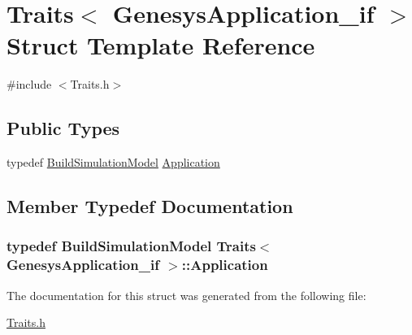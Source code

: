 \hypertarget{struct_traits_3_01_genesys_application__if_01_4}{}\section{Traits$<$ Genesys\+Application\+\_\+if $>$ Struct Template Reference}
\label{struct_traits_3_01_genesys_application__if_01_4}


{\ttfamily \#include $<$Traits.\+h$>$}

\subsection*{Public Types}
\begin{DoxyCompactItemize}
\item 
typedef \hyperlink{class_build_simulation_model}{Build\+Simulation\+Model} \hyperlink{struct_traits_3_01_genesys_application__if_01_4_af0589b9f1736bfc743309ed001e2b796}{Application}
\end{DoxyCompactItemize}


\subsection{Member Typedef Documentation}
\subsubsection[{\texorpdfstring{Application}{Application}}]{\setlength{\rightskip}{0pt plus 5cm}typedef {\bf Build\+Simulation\+Model} {\bf Traits}$<$ {\bf Genesys\+Application\+\_\+if} $>$\+::{\bf Application}}\hypertarget{struct_traits_3_01_genesys_application__if_01_4_af0589b9f1736bfc743309ed001e2b796}{}\label{struct_traits_3_01_genesys_application__if_01_4_af0589b9f1736bfc743309ed001e2b796}


The documentation for this struct was generated from the following file\+:\begin{DoxyCompactItemize}
\item 
\hyperlink{_traits_8h}{Traits.\+h}\end{DoxyCompactItemize}
